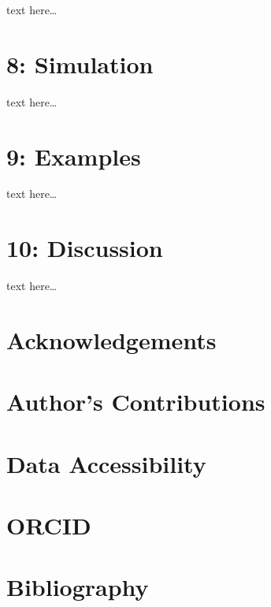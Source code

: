\documentclass[
  11pt]{article}
\begin{document}
text here\ldots{} \FloatBarrier

\hypertarget{simulation}{%
\section{8: Simulation}\label{simulation}}

text here\ldots{} \FloatBarrier

\hypertarget{examples}{%
\section{9: Examples}\label{examples}}

text here\ldots{} \FloatBarrier

\hypertarget{discussion}{%
\section{10: Discussion}\label{discussion}}

text here\ldots{}

\hypertarget{acknowledgements}{%
\section{Acknowledgements}\label{acknowledgements}}

\hypertarget{authors-contributions}{%
\section{Author's Contributions}\label{authors-contributions}}

\hypertarget{data-accessibility}{%
\section{Data Accessibility}\label{data-accessibility}}

\hypertarget{orcid}{%
\section{ORCID}\label{orcid}}

\hypertarget{bibliography}{%
\section{Bibliography}\label{bibliography}}
\end{document}
